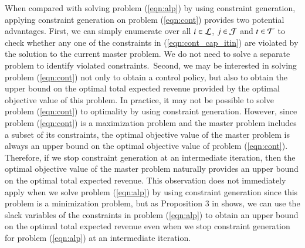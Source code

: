 When compared with solving problem (\ref{eqn:alp}) by using constraint generation, applying constraint generation on problem (\ref{eqn:cont}) provides two potential advantages. First, we can simply enumerate over all $i \in {\cal L}$, $j \in {\cal J}$ and $t \in {\cal T}$ to check whether any one of the constraints in (\ref{eqn:cont_cap_itin}) are violated by the solution to the current master problem. We do not need to solve a separate problem to identify violated constraints.~Second, we may be interested in solving problem (\ref{eqn:cont}) not only to obtain a control policy, but also to obtain the upper bound on the optimal total expected revenue provided by the optimal objective value of this problem. In practice, it may not be possible to solve problem (\ref{eqn:cont}) to optimality by using constraint generation. However, since problem (\ref{eqn:cont}) is a maximization problem and the master problem includes a subset of its constraints, the optimal objective value of the master problem is always an upper bound on the optimal objective value of problem (\ref{eqn:cont}). Therefore, if we stop constraint generation at an intermediate iteration, then the optimal objective value of the master problem naturally provides an upper bound on the optimal total expected revenue. This observation does not immediately apply when we solve problem (\ref{eqn:alp}) by using constraint generation since this problem is a minimization problem, but as Proposition 3 in  shows, we can use the slack variables of the constraints in problem (\ref{eqn:alp}) to obtain an upper bound on the optimal total expected revenue even when we stop constraint generation for problem (\ref{eqn:alp}) at an intermediate iteration.


